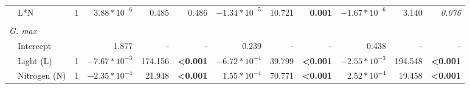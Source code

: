 \begin{landscape}
\begin{table}
{\begin{tabular}{p{0.1cm}p{2.5cm}p{0.5cm}p{1.75cm}p{1.5cm}p{1.5cm}p{1.75cm}p{1.5cm}p{1.5cm}p{1.75cm}p{1.5cm}p{1.5cm}}
         & L*N
         & \multicolumn{1}{r}{1}            
         & \multicolumn{1}{r}{$3.88*10^{-6}$}     & \multicolumn{1}{r}{0.485}     & \multicolumn{1}{r}{0.486}
         & \multicolumn{1}{r}{$-1.34*10^{-5}$}    & \multicolumn{1}{r}{10.721}    & \multicolumn{1}{r}{\textbf{0.001}}
         & \multicolumn{1}{r}{$-1.67*10^{-6}$}   & \multicolumn{1}{r}{3.140}     & \multicolumn{1}{r}{\textit{0.076}}                 
         \\ 
         &&&&&&&&&& 
         \\ 
         
         \multicolumn{2}{l}{\textit{G. max}} &&&&&&&&&& 
         \\
         & Intercept
         && \multicolumn{1}{r}{1.877}       & \multicolumn{1}{r}{-}         & \multicolumn{1}{r}{-}                     
         & \multicolumn{1}{r}{0.239}        & \multicolumn{1}{r}{-}         & \multicolumn{1}{r}{-}  
         & \multicolumn{1}{r}{0.438}        & \multicolumn{1}{r}{-}         & \multicolumn{1}{r}{-} 
         \\
         
         & Light (L)
         & \multicolumn{1}{r}{1}
         & \multicolumn{1}{r}{$-7.67*10^{-3}$}    & \multicolumn{1}{r}{174.156}   & \multicolumn{1}{r}{\textbf{<0.001}}      
         & \multicolumn{1}{r}{$-6.72*10^{-4}$}    & \multicolumn{1}{r}{39.799}    & \multicolumn{1}{r}{\textbf{<0.001}}
         & \multicolumn{1}{r}{$-2.55*10^{-3}$}    & \multicolumn{1}{r}{194.548}   & \multicolumn{1}{r}{\textbf{<0.001}} 
         \\
         
         & Nitrogen (N)
         & \multicolumn{1}{r}{1} 
         & \multicolumn{1}{r}{$-2.35*10^{-4}$}    & \multicolumn{1}{r}{21.948}    & \multicolumn{1}{r}{\textbf{<0.001}}
         & \multicolumn{1}{r}{$1.55*10^{-4}$}     & \multicolumn{1}{r}{70.771}    & \multicolumn{1}{r}{\textbf{<0.001}}
         & \multicolumn{1}{r}{$2.52*10^{-4}$}     & \multicolumn{1}{r}{19.458}    & \multicolumn{1}{r}{\textbf{<0.001}} 
         \\
         

\end{tabular}}
\end{table}
\end{landscape}
